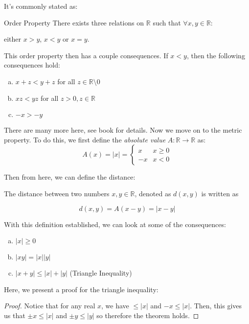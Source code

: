 It's commonly stated as: 

\begin{definition}{Order Property}{}
    There exists three relations on $\mathbb R$ such that $\forall x, y \in \mathbb R$: 


    either $x > y$, $x < y$ or $x = y$.
\end{definition}

This order property then has a couple consequences. If $x < y$, then the following consequences hold: 

\begin{enumerate}[(a)]
    \item $x + z < y + z$ for all $z \in \mathbb R \setminus 0$
    \item $xz < yz$ for all $z> 0, z \in \mathbb R$
    \item $-x > -y$
\end{enumerate}

There are many more here, see book for details. Now we move on to the metric property. To do this, we first define the \textit{absolute value} $A: \mathbb R \to \mathbb R$ as:
    \[ A(x) = |x| = \begin{cases}
        x & x \ge 0\\
        -x & x < 0
    \end{cases}\] 

Then from here, we can define the distance: 

\begin{definition}{}{}
    The distance between two numbers $x, y \in \mathbb R$, denoted as $d(x, y)$ is written as

    \[ d(x, y) = A(x - y) = |x - y|\]
\end{definition}

With this definition established, we can look at some of the consequences: 

\begin{enumerate}[(a)]
    \item $|x| \ge 0$
    \item $|xy| = |x||y|$
    \item $|x + y| \le |x| + |y|$ (Triangle Inequality)
\end{enumerate}

Here, we present a proof for the triangle inequality:

\begin{proof}
    Notice that for any real $x$, we have $\le |x|$ and $-x \le |x|$. Then, this gives us that $ \pm x \le |x|$ and $ \pm y \le |y|$ so therefore the theorem holds.
\end{proof}
